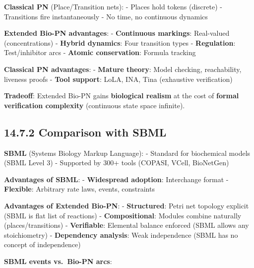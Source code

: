 \textbf{Classical PN} (Place/Transition nets): - Places hold tokens
(discrete) - Transitions fire instantaneously - No time, no continuous
dynamics

\textbf{Extended Bio-PN advantages}: - \textbf{Continuous markings}:
Real-valued (concentrations) - \textbf{Hybrid dynamics}: Four transition
types - \textbf{Regulation}: Test/inhibitor arcs - \textbf{Atomic
conservation}: Formula tracking

\textbf{Classical PN advantages}: - \textbf{Mature theory}: Model
checking, reachability, liveness proofs - \textbf{Tool support}: LoLA,
INA, Tina (exhaustive verification)

\textbf{Tradeoff}: Extended Bio-PN gains \textbf{biological realism} at
the cost of \textbf{formal verification complexity} (continuous state
space infinite).

\hypertarget{comparison-with-sbml}{%
\subsection{14.7.2 Comparison with SBML}\label{comparison-with-sbml}}

\textbf{SBML} (Systems Biology Markup Language): - Standard for
biochemical models (SBML Level 3) - Supported by 300+ tools (COPASI,
VCell, BioNetGen)

\textbf{Advantages of SBML}: - \textbf{Widespread adoption}: Interchange
format - \textbf{Flexible}: Arbitrary rate laws, events, constraints

\textbf{Advantages of Extended Bio-PN}: - \textbf{Structured}: Petri net
topology explicit (SBML is flat list of reactions) -
\textbf{Compositional}: Modules combine naturally (places/transitions) -
\textbf{Verifiable}: Elemental balance enforced (SBML allows any
stoichiometry) - \textbf{Dependency analysis}: Weak independence (SBML
has no concept of independence)

\textbf{SBML events vs.~Bio-PN arcs}:

